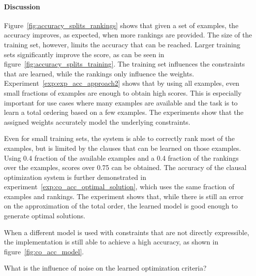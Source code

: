 \paragraph{Discussion}
Figure~\ref{fig:accuracy_splits_rankings} shows that given a set of examples, the accuracy improves, as expected, when more rankings are provided.
The size of the training set, however, limits the accuracy that can be reached.
Larger training sets significantly improve the score, as can be seen in figure~\ref{fig:accuracy_splits_training}.
The training set influences the constraints that are learned, while the rankings only influence the weights.
Experiment~\ref{exp:exp_acc_approach2} shows that by using all examples, even small fractions of examples are enough to obtain high scores.
This is especially important for use cases where many examples are available and the task is to learn a total ordering based on a few examples.
The experiments show that the assigned weights accurately model the underlying constraints.

Even for small training sets, the system is able to correctly rank most of the examples, but is limited by the clauses that can be learned on those examples.
Using 0.4 fraction of the available examples and a 0.4 fraction of the rankings over the examples, scores over 0.75 can be obtained.
The accuracy of the clausal optimization system is further demonstrated in experiment~\ref{exp:co_acc_optimal_solution}, which uses the same fraction of examples and rankings.
The experiment shows that, while there is still an error on the approximation of the total order, the learned model is good enough to generate optimal solutions.

When a different model is used with constraints that are not directly expressible, the implementation is still able to achieve a high accuracy, as shown in figure~\ref{fig:co_acc_model}.

\begin{question}
	What is the influence of noise on the learned optimization criteria?
\end{question}

